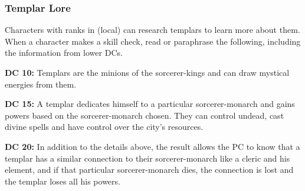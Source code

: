 \subsubsection{Templar Lore}
Characters with ranks in  (local) can research templars to learn more about them. When a character makes a skill check, read or paraphrase the following, including the information from lower DCs.

\textbf{DC 10:} Templars are the minions of the sorcerer-kings and can draw mystical energies from them.

\textbf{DC 15:} A templar dedicates himself to a particular sorcerer-monarch and gains powers based on the sorcerer-monarch chosen. They can control undead, cast divine spells and have control over the city's resources.

\textbf{DC 20:} In addition to the details above, the result allows the PC to know that a templar has a similar connection to their sorcerer-monarch like a cleric and his element, and if that particular sorcerer-monarch dies, the connection is lost and the templar loses all his powers.

